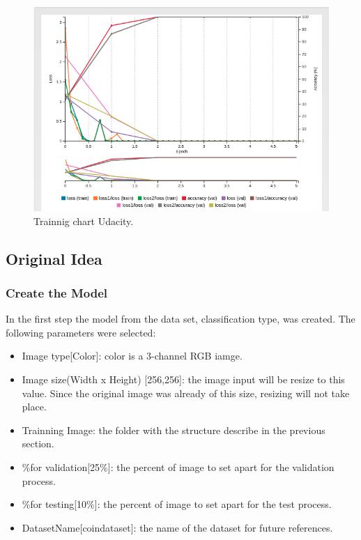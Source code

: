\documentclass[10pt,journal,compsoc]{IEEEtran}
\begin{document}
\begin{figure}[h]
\centering
\includegraphics[scale=0.3]{trainning-chart}
\caption{Trainnig chart Udacity.}
\label{fig:figure3}
\end{figure}


\subsection{Original Idea}
\subsubsection{Create the Model}

In the first step the model from the data set, classification type, was created. The following parameters were selected:

\begin{itemize}
\item Image type[Color]: color is a  3-channel RGB iamge.
\item Image size(Width x Height) [256,256]: the image input will be resize to this value. Since the original image was already of this size, resizing will not take place.
\item Trainning Image: the folder with the structure describe in the previous section. 
\item \%for validation[25\%]: the percent of image to set apart for the validation process.
\item \%for testing[10\%]: the percent of image to set apart for the test process.
\item DatasetName[coin\-dataset]: the name of the dataset for future references.
\end{itemize}
\end{document}
